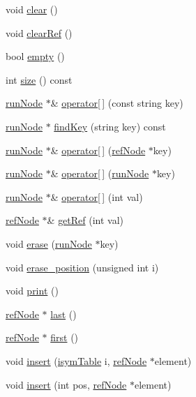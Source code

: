 \begin{DoxyCompactItemize}
\item 
void \hyperlink{classsymbolsTable_a55a96b31c88df6eca606d84013e1f580}{clear} ()
\item 
void \hyperlink{classsymbolsTable_a1bf4ad22533d92d422e7f6691875d118}{clear\-Ref} ()
\item 
bool \hyperlink{classsymbolsTable_aae5d6585aaa7eaa2202708c15b33fc4d}{empty} ()
\item 
int \hyperlink{classsymbolsTable_a72a408962416eeea6555b6c11a396d6f}{size} () const 
\item 
\hyperlink{classrunNode}{run\-Node} $\ast$\& \hyperlink{classsymbolsTable_a3c0e01f4c039713ad0ba22939ac4828a}{operator\mbox{[}$\,$\mbox{]}} (const string key)
\item 
\hyperlink{classrunNode}{run\-Node} $\ast$ \hyperlink{classsymbolsTable_a940e94aacbfd0d986450cef1e40859f0}{find\-Key} (string key) const 
\item 
\hyperlink{classrunNode}{run\-Node} $\ast$\& \hyperlink{classsymbolsTable_aeb92f6558212eebc8177a96f54eaaa6d}{operator\mbox{[}$\,$\mbox{]}} (\hyperlink{classrefNode}{ref\-Node} $\ast$key)
\item 
\hyperlink{classrunNode}{run\-Node} $\ast$\& \hyperlink{classsymbolsTable_aa9c3af63a1bdd221ad4a0d3075789752}{operator\mbox{[}$\,$\mbox{]}} (\hyperlink{classrunNode}{run\-Node} $\ast$key)
\item 
\hyperlink{classrunNode}{run\-Node} $\ast$\& \hyperlink{classsymbolsTable_ad6b641fd0059cebe19567bcff9be5aba}{operator\mbox{[}$\,$\mbox{]}} (int val)
\item 
\hyperlink{classrefNode}{ref\-Node} $\ast$\& \hyperlink{classsymbolsTable_a721b39ab8b58ed80297d847103fc77c9}{get\-Ref} (int val)
\item 
void \hyperlink{classsymbolsTable_a4e4e8b92f9a02430923bc3bf0b51528f}{erase} (\hyperlink{classrunNode}{run\-Node} $\ast$key)
\item 
void \hyperlink{classsymbolsTable_ad8cd21aa6ed7089a06c64458d926ce9f}{erase\-\_\-position} (unsigned int i)
\item 
void \hyperlink{classsymbolsTable_a7cf87d654443c053aa10bab7de16340d}{print} ()
\item 
\hyperlink{classrefNode}{ref\-Node} $\ast$ \hyperlink{classsymbolsTable_ac974b6dcd3255b609d62a6d468df8531}{last} ()
\item 
\hyperlink{classrefNode}{ref\-Node} $\ast$ \hyperlink{classsymbolsTable_a01d8d5006dd3a20bb1501255fa6404c7}{first} ()
\item 
void \hyperlink{classsymbolsTable_a79b0198ef35c8a82bdb509960cae3091}{insert} (\hyperlink{classisymTable}{isym\-Table} i, \hyperlink{classrefNode}{ref\-Node} $\ast$element)
\item 
void \hyperlink{classsymbolsTable_a5c91259a0aa1eccc1d5efb03ba3deff8}{insert} (int pos, \hyperlink{classrefNode}{ref\-Node} $\ast$element)
\end{DoxyCompactItemize}
